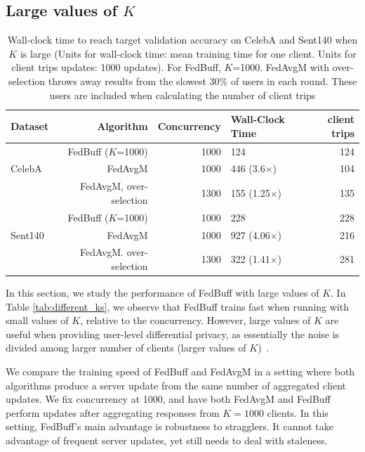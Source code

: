 \documentclass[twoside]{article}
\newcommand\Tstrut{\rule{0pt}{2.6ex}}         %
\newcommand{\algname}{{FedBuff}\xspace}
\begin{document}
\subsection{Large values of $K$}
\label{sec:appendix_large_k}

\begin{table}
\caption{Wall-clock time to reach target validation accuracy on CelebA and Sent140 when $K$ is large (Units for wall-clock time: mean training time for one client. Units for client trips updates: 1000 updates). For \algname{}, $K$=1000. FedAvgM with over-selection throws away results from the slowest 30\% of users in each round. These users are included when calculating the number of client trips}
\label{tab:large_k}
\centering
\begin{tabular}{lrrlr} 
\toprule
Dataset & Algorithm & Concurrency & Wall-Clock Time & client trips \\ 
\hline
\Tstrut{}
        &   FedBuff ($K$=1000)             & 1000    & 124            & 124\\
CelebA  &   FedAvgM                        & 1000    & 446 (3.6$\times$)     & 104\\
        &   FedAvgM, over-selection        & 1300    & 155 (1.25$\times$)    & 135\\ 
\hline
\Tstrut{}
        &   FedBuff ($K$=1000)             & 1000    & 228            & 228\\
Sent140 &   FedAvgM                        & 1000    & 927 (4.06$\times$)    & 216\\
        &   FedAvgM. over-selection    & 1300    & 322 (1.41$\times$)    & 281\\
        \bottomrule
\end{tabular}
\end{table}

In this section, we study the performance of \algname with large values of $K$. In Table \ref{tab:different_ks}, we observe that \algname{} trains fast when running with small values of $K$, relative to the concurrency. However, large values of $K$ are useful when providing user-level differential privacy, as essentially the noise is divided among larger number of clients (larger values of $K$)~\citep{dpftrl, google-dp-fl}. 

We compare the training speed of \algname{} and FedAvgM in a setting where both algorithms produce a server update from the same number of aggregated client updates. We fix concurrency at 1000, and have both FedAvgM and \algname{} perform updates after aggregating responses from $K=1000$ clients. In this setting, \algname{}'s main advantage is robustness to stragglers. It cannot take advantage of frequent server updates, yet still needs to deal with staleness. 
\end{document}
